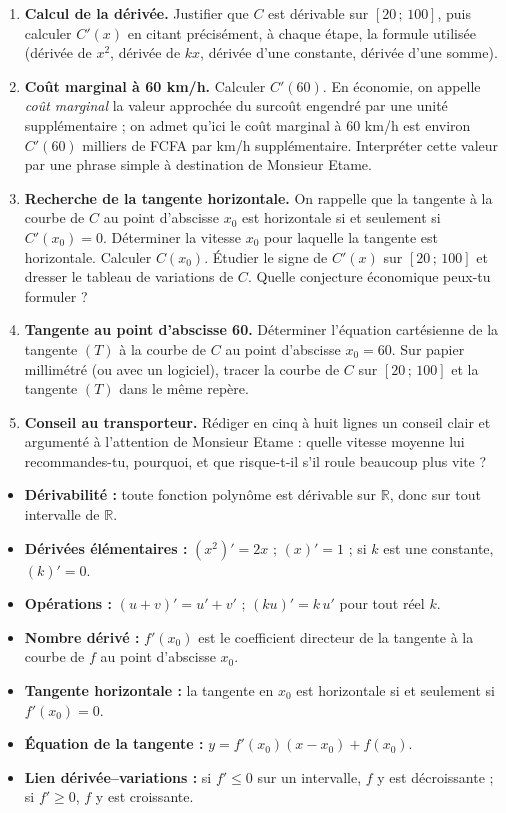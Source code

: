 \documentclass[11pt]{article}
\newcounter{popsec}
\newcounter{popsub}
\newcommand{\courssub}[1]{%
  \stepcounter{popsub}%
  \par\vspace{9pt}\noindent{\popxbold\fontsize{11.5}{13}\selectfont\color{popink}{\color{poporange}\thepopsec.\thepopsub}\hspace{6pt}#1}\par\nopagebreak\vspace{4pt}
}
\begin{document}
\begin{enumerate}
\item \textbf{Calcul de la dérivée.} Justifier que $C$ est dérivable sur $[20\,;\,100]$, puis calculer $C'(x)$ en citant précisément, à chaque étape, la formule utilisée (dérivée de $x^2$, dérivée de $kx$, dérivée d'une constante, dérivée d'une somme).
\item \textbf{Coût marginal à 60 km/h.} Calculer $C'(60)$. En économie, on appelle \emph{coût marginal} la valeur approchée du surcoût engendré par une unité supplémentaire ; on admet qu'ici le coût marginal à $60$ km/h est environ $C'(60)$ milliers de FCFA par km/h supplémentaire. Interpréter cette valeur par une phrase simple à destination de Monsieur Etame.
\item \textbf{Recherche de la tangente horizontale.} On rappelle que la tangente à la courbe de $C$ au point d'abscisse $x_0$ est horizontale si et seulement si $C'(x_0) = 0$. Déterminer la vitesse $x_0$ pour laquelle la tangente est horizontale. Calculer $C(x_0)$. Étudier le signe de $C'(x)$ sur $[20\,;\,100]$ et dresser le tableau de variations de $C$. Quelle conjecture économique peux-tu formuler ?
\item \textbf{Tangente au point d'abscisse 60.} Déterminer l'équation cartésienne de la tangente $(T)$ à la courbe de $C$ au point d'abscisse $x_0 = 60$. Sur papier millimétré (ou avec un logiciel), tracer la courbe de $C$ sur $[20\,;\,100]$ et la tangente $(T)$ dans le même repère.
\item \textbf{Conseil au transporteur.} Rédiger en cinq à huit lignes un conseil clair et argumenté à l'attention de Monsieur Etame : quelle vitesse moyenne lui recommandes-tu, pourquoi, et que risque-t-il s'il roule beaucoup plus vite ?
\end{enumerate}

\courssub{Ressources à mobiliser}

\begin{aretenir}
\begin{itemize}
\item \textbf{Dérivabilité :} toute fonction polynôme est dérivable sur $\mathbb{R}$, donc sur tout intervalle de $\mathbb{R}$.
\item \textbf{Dérivées élémentaires :} $(x^2)' = 2x$ ; $(x)' = 1$ ; si $k$ est une constante, $(k)' = 0$.
\item \textbf{Opérations :} $(u+v)' = u' + v'$ ; $(ku)' = k\,u'$ pour tout réel $k$.
\item \textbf{Nombre dérivé :} $f'(x_0)$ est le coefficient directeur de la tangente à la courbe de $f$ au point d'abscisse $x_0$.
\item \textbf{Tangente horizontale :} la tangente en $x_0$ est horizontale si et seulement si $f'(x_0) = 0$.
\item \textbf{Équation de la tangente :} $y = f'(x_0)(x - x_0) + f(x_0)$.
\item \textbf{Lien dérivée--variations :} si $f' \leq 0$ sur un intervalle, $f$ y est décroissante ; si $f' \geq 0$, $f$ y est croissante.
\end{itemize}
\end{aretenir}
\end{document}
